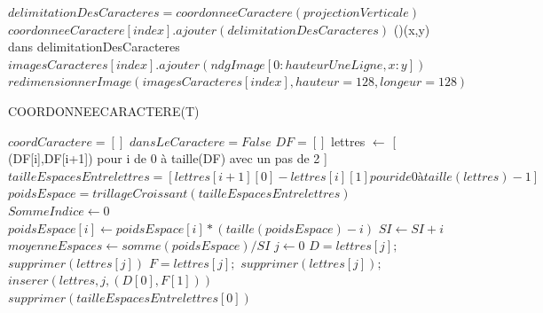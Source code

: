 \documentclass[a4paper]{article}
\begin{document}
\begin{algorithm}
{					$delimitationDesCaracteres = coordonneeCaractere(projectionVerticale)$\;
					\BlankLine
					$coordonneeCaractere[index].ajouter(delimitationDesCaracteres)$\;
    				\For(){(x,y) dans delimitationDesCaracteres}
					{
						$imagesCaracteres[index].ajouter(ndgImage[0:hauteurUneLigne, x:y])$\;
					}
					$redimensionnerImage(imagesCaracteres[index],hauteur = 128,longeur = 128)$\;
					\BlankLine
				}
			\end{algorithm}
			\newpage
			\begin{algorithm}
				\LinesNumbered
				\caption{COORDONNEECARACTERE(T)}\label{alg:coordcar}
				\BlankLine
				$coordCaractere = []$\;
				\BlankLine
				$dansLeCaractere = False$\;
				$DF = []$\;
				\BlankLine
				{
				}
				lettres $\gets$ [ (DF[i],DF[i+1]) pour i de 0 à taille(DF) avec un pas de 2 ]\;
				\BlankLine
				$tailleEspacesEntrelettres = [ lettres[i+1][0]-lettres[i][1] pour i de 0 à taille(lettres)-1 ]$\;
				$poidsEspace = trillageCroissant(tailleEspacesEntrelettres)$\;
				\BlankLine
				$SommeIndice \gets 0$\;
				{
					$poidsEspace[i] \gets poidsEspace[i] * (taille(poidsEspace)-i)$\;
				    $SI \gets SI + i$\;
				}
				$moyenneEspaces \gets somme(poidsEspace) / SI$\;
				$j \gets 0$\;
				{
					 {
						$D = lettres[j];$ $supprimer(lettres[j])$\;
						$F = lettres[j];$ $supprimer(lettres[j]);$\;
						$inserer(lettres,j,(D[0],F[1]))$\;
					}	
					$supprimer(tailleEspacesEntrelettres[0])$\;
				}
			\end{algorithm}
\end{document}
